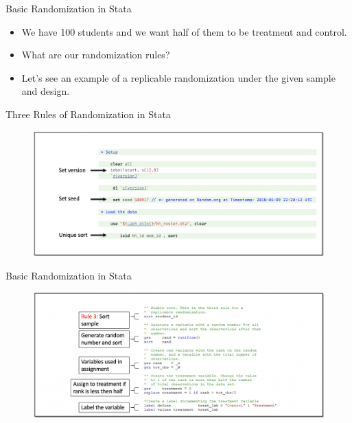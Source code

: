 \documentclass[aspectratio=169]{beamer}
\begin{document}
\begin{frame}{Basic Randomization in Stata}
	
	\begin{itemize}[<default overlay specification>]
		\item<1>  We have 100 students and we want half of them to be treatment and control.
		\item<1>  What are our randomization rules?
		\item<1>  Let’s see an example of a replicable randomization under the given sample and design.
	\end{itemize}
	
\end{frame}


\begin{frame}{Three Rules of Randomization in Stata}

\begin{figure}
	\centering
	\includegraphics[width=\linewidth]{img/Randomization9}
\end{figure}

\end{frame}


\begin{frame}{Basic Randomization in Stata}

\begin{figure}
	\centering
	\includegraphics[width=\linewidth]{img/Randomization10}
\end{figure}

\end{frame}
\end{document}
